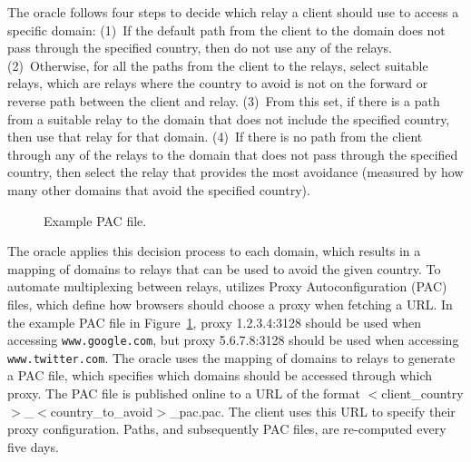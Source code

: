 The oracle follows four steps to decide which relay a client should
use to access a specific domain: (1)~If the default path from the
client to the domain does not pass through the specified country, then
do not use any of the relays.  (2)~Otherwise, for all the paths from
the client to the relays, select suitable relays, which are relays where the country 
to avoid is not on the forward or reverse path between the client and 
relay.  (3)~From this set, if there
is a path from a suitable relay to the domain that does not include
the specified country, then use that relay for that domain.  (4)~If
there is no path from the client through any of the relays to the
domain that does not pass through the specified country, then select
the relay that provides the most avoidance (measured by how many other
domains that avoid the specified country).

%

\begin{figure}[t]
\centering
{}
\caption{Example PAC file.}
\label{lst:pac}
\end{figure}

The oracle applies this decision process to each domain, which results
in a mapping of domains to relays that can be used to avoid the given
country.  To automate multiplexing between relays,
\system{} utilizes Proxy Autoconfiguration (PAC) files, which define
how browsers should choose a proxy when fetching a URL.  In the
example PAC file in Figure~\ref{lst:pac}, proxy 1.2.3.4:3128
should be used when accessing {\tt www.google.com}, but proxy
5.6.7.8:3128 should be used when accessing {\tt www.twitter.com}.  The
oracle uses the mapping of domains to relays to generate a PAC file,
which specifies which domains should be accessed through which proxy.
The PAC file is published online to a URL of the format
$<$client\_country$>$\_$<$country\_to\_avoid$>$\_pac.pac.  The client
uses this URL to specify their proxy configuration.  Paths, and subsequently PAC files, are
re-computed every five days.

